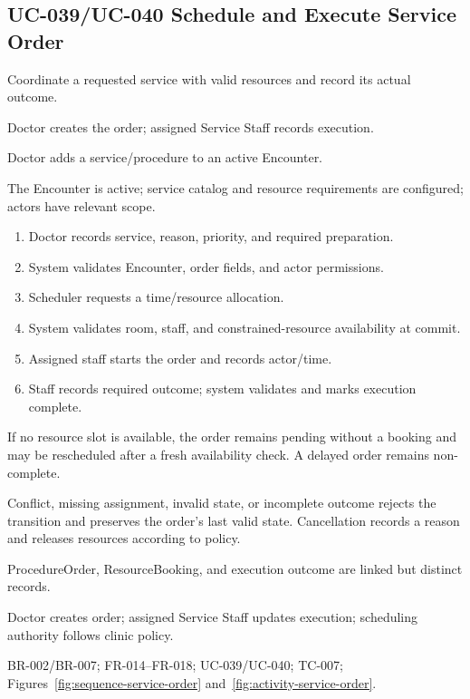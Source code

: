 \subsection{UC-039/UC-040 Schedule and Execute Service Order}
\begin{description}[leftmargin=2.6cm,style=nextline]
\item[Goal] Coordinate a requested service with valid resources and record its actual outcome.
\item[Primary actors] Doctor creates the order; assigned Service Staff records execution.
\item[Trigger] Doctor adds a service/procedure to an active Encounter.
\item[Preconditions] The Encounter is active; service catalog and resource requirements are configured; actors have relevant scope.
\item[Main success flow]
\begin{enumerate}[leftmargin=1.4em]
  \item Doctor records service, reason, priority, and required preparation.
  \item System validates Encounter, order fields, and actor permissions.
  \item Scheduler requests a time/resource allocation.
  \item System validates room, staff, and constrained-resource availability at commit.
  \item Assigned staff starts the order and records actor/time.
  \item Staff records required outcome; system validates and marks execution complete.
\end{enumerate}
\item[Alternative flows] If no resource slot is available, the order remains pending without a booking and may be rescheduled after a fresh availability check. A delayed order remains non-complete.
\item[Exception flows] Conflict, missing assignment, invalid state, or incomplete outcome rejects the transition and preserves the order's last valid state. Cancellation records a reason and releases resources according to policy.
\item[Postconditions and data] ProcedureOrder, ResourceBooking, and execution outcome are linked but distinct records.
\item[Authorization] Doctor creates order; assigned Service Staff updates execution; scheduling authority follows clinic policy.
\item[Trace] BR-002/BR-007; FR-014--FR-018; UC-039/UC-040; TC-007; Figures~\ref{fig:sequence-service-order} and~\ref{fig:activity-service-order}.
\end{description}

